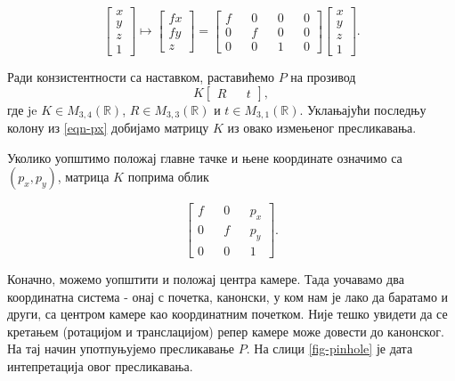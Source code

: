 \documentclass[12pt, a4paper, twoside]{book}
\numberwithin{equation}{chapter}
\numberwithin{theorem}{section}
\numberwithin{definition}{section}
\numberwithin{definitionChapter}{chapter}
\begin{document}
	\begin{equation}
		\begin{bmatrix}
			x \\
			y \\
			z \\
			1
		\end{bmatrix}
		\mapsto
		\begin{bmatrix}
			fx \\
			fy \\
			z
		\end{bmatrix}
		=
		\begin{bmatrix}
			f && 0 && 0 && 0 \\
			0 && f && 0 && 0 \\
			0 && 0 && 1 && 0
		\end{bmatrix}
		\begin{bmatrix}
			x \\
			y \\
			z \\
			1
		\end{bmatrix}.
		\label{eqn-px}
	\end{equation}

	Ради конзистентности са наставком, раставићемо $P$ на прозивод
	\begin{equation}
		K
		\begin{bmatrix}
			R && t
		\end{bmatrix},
		\label{eqn-krt}
	\end{equation}
	где je $K \in M_{3, 4}(\mathbb{R})$, $R \in M_{3, 3}(\mathbb{R})$ и $t \in M_{3, 1}(\mathbb{R})$.
	Уклањајући последњу колону из \ref{eqn-px} добијамо матрицу $K$ из овако измењеног пресликавања.
	
	Уколико уопштимо положај главне тачке и њене координате означимо са $(p_x, p_y)$, матрица $K$
	поприма облик
	
	\begin{equation}
		\begin{bmatrix}
			f && 0 && p_x \\
			0 && f && p_y \\
			0 && 0 && 1
		\end{bmatrix}.
	\end{equation}

	Коначно, можемо уопштити и положај центра камере. Тада уочавамо два координатна система -
	онај с почетка, канонски, у ком нам је лако да баратамо и други, са центром камере као
	координатним почетком. Није тешко увидети да се кретањем (ротацијом и транслацијом) репер камере
	може довести до канонског. На тај начин употпуњујемо пресликавање $P$. На слици \ref{fig-pinhole} 
	је дата интепретација овог пресликавања.
	
\end{document}
